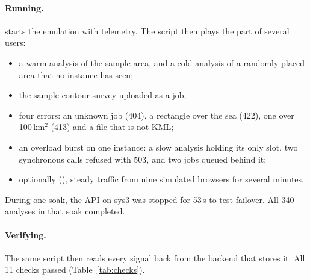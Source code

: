 \documentclass[11pt,a4paper]{article}
\begin{document}
\paragraph{Running.}
 starts the emulation with telemetry. The script
 then plays the part of several users:
\begin{itemize}
  \item a warm analysis of the sample area, and a cold analysis of a randomly placed area that
    no instance has seen;
  \item the sample contour survey uploaded as a job;
  \item four errors: an unknown job (404), a rectangle over the sea (422), one over 100\,km$^2$
    (413) and a file that is not KML;
  \item an overload burst on one instance: a slow analysis holding its only slot, two synchronous
    calls refused with 503, and two jobs queued behind it;
  \item optionally (), steady traffic from nine simulated browsers for several minutes.
\end{itemize}
During one soak, the API on sys3 was stopped for 53\,s to test failover. All 340 analyses in
that soak completed.

\paragraph{Verifying.}
The same script then reads every signal back from the backend that stores it. All 11 checks
passed (Table~\ref{tab:checks}).
\end{document}
